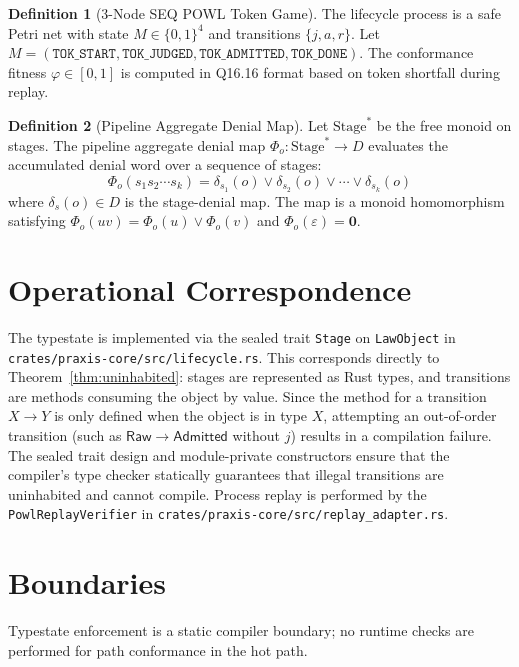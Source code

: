 \documentclass[11pt,oneside]{book}
\theoremstyle{definition}
\newtheorem{definition}{Definition}[chapter]
\theoremstyle{plain}
\theoremstyle{remark}
\newcommand{\Raw}{\mathsf{Raw}}
\newcommand{\Admd}{\mathsf{Admitted}}
\newcommand{\code}[1]{\texttt{#1}}
\begin{document}
\begin{definition}[3-Node SEQ POWL Token Game]\label{def:token_game}
The lifecycle process is a safe Petri net with state $M \in \{0, 1\}^4$ and transitions $\{j, a, r\}$. %
Let $M = (\code{TOK\_START}, \code{TOK\_JUDGED}, \code{TOK\_ADMITTED}, \code{TOK\_DONE})$. %
The conformance fitness $\varphi \in [0, 1]$ is computed in Q16.16 format based on token shortfall during replay. %
\end{definition}

\begin{definition}[Pipeline Aggregate Denial Map]\label{def:pipeline_denial}
Let $\mathrm{Stage}^*$ be the free monoid on stages. %
The pipeline aggregate denial map $\Phi_o: \mathrm{Stage}^* \to D$ evaluates the accumulated denial word over a sequence of stages:
\[
\Phi_o(s_1s_2\cdots s_k) = \delta_{s_1}(o)\lor\delta_{s_2}(o)\lor\cdots\lor\delta_{s_k}(o)
\]
where $\delta_s(o) \in D$ is the stage-denial map. %
The map is a monoid homomorphism satisfying $\Phi_o(uv) = \Phi_o(u) \lor \Phi_o(v)$ and $\Phi_o(\varepsilon) = \mathbf{0}$. %
\end{definition}

\section{Operational Correspondence}
The typestate is implemented via the sealed trait \code{Stage} on \code{LawObject} in \code{crates/praxis-core/src/lifecycle.rs}. %
This corresponds directly to Theorem~\ref{thm:uninhabited}: stages are represented as Rust types, and transitions are methods consuming the object by value. %
Since the method for a transition $X \to Y$ is only defined when the object is in type $X$, attempting an out-of-order transition (such as $\Raw \to \Admd$ without $j$) results in a compilation failure. %
The sealed trait design and module-private constructors ensure that the compiler's type checker statically guarantees that illegal transitions are uninhabited and cannot compile. %
Process replay is performed by the \code{PowlReplayVerifier} in \code{crates/praxis-core/src/replay\_adapter.rs}. %

\section{Boundaries}
Typestate enforcement is a static compiler boundary; no runtime checks are performed for path conformance in the hot path. %
\end{document}
